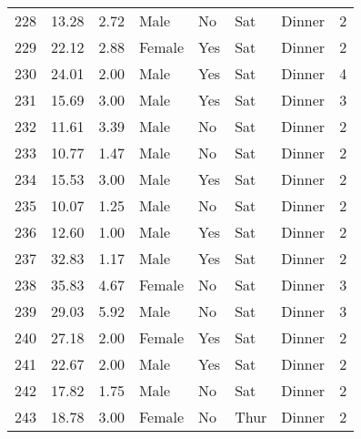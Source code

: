 \begin{tabular}{lrrllllr}
228 &       13.28 &   2.72 &    Male &     No &   Sat &  Dinner &     2 \\
229 &       22.12 &   2.88 &  Female &    Yes &   Sat &  Dinner &     2 \\
230 &       24.01 &   2.00 &    Male &    Yes &   Sat &  Dinner &     4 \\
231 &       15.69 &   3.00 &    Male &    Yes &   Sat &  Dinner &     3 \\
232 &       11.61 &   3.39 &    Male &     No &   Sat &  Dinner &     2 \\
233 &       10.77 &   1.47 &    Male &     No &   Sat &  Dinner &     2 \\
234 &       15.53 &   3.00 &    Male &    Yes &   Sat &  Dinner &     2 \\
235 &       10.07 &   1.25 &    Male &     No &   Sat &  Dinner &     2 \\
236 &       12.60 &   1.00 &    Male &    Yes &   Sat &  Dinner &     2 \\
237 &       32.83 &   1.17 &    Male &    Yes &   Sat &  Dinner &     2 \\
238 &       35.83 &   4.67 &  Female &     No &   Sat &  Dinner &     3 \\
239 &       29.03 &   5.92 &    Male &     No &   Sat &  Dinner &     3 \\
240 &       27.18 &   2.00 &  Female &    Yes &   Sat &  Dinner &     2 \\
241 &       22.67 &   2.00 &    Male &    Yes &   Sat &  Dinner &     2 \\
242 &       17.82 &   1.75 &    Male &     No &   Sat &  Dinner &     2 \\
243 &       18.78 &   3.00 &  Female &     No &  Thur &  Dinner &     2 \\
\bottomrule
\end{tabular}
